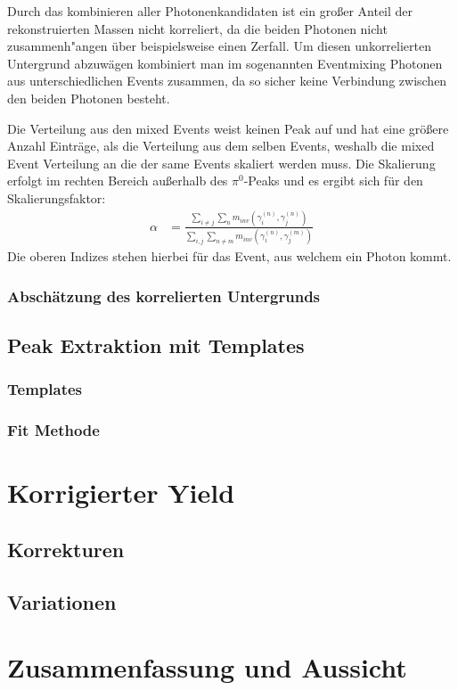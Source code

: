 \documentclass[]{article}
\begin{document}
	Durch das kombinieren aller Photonenkandidaten ist ein gro{\ss}er Anteil der rekonstruierten Massen nicht korreliert, da die beiden Photonen nicht zusammenh{"a}ngen {\"u}ber beispielsweise einen Zerfall. Um diesen unkorrelierten Untergrund abzuw{\"a}gen kombiniert man im sogenannten Eventmixing Photonen aus unterschiedlichen Events zusammen, da so sicher keine Verbindung zwischen den beiden Photonen besteht.
	
	
	Die Verteilung aus den mixed Events weist keinen Peak auf und hat eine gr{\"o}{\ss}ere Anzahl Eintr{\"a}ge, als die Verteilung aus dem selben Events, weshalb die mixed Event Verteilung an die der same Events skaliert werden muss. Die Skalierung erfolgt im rechten Bereich au{\ss}erhalb des $\pi^{0}$-Peaks und es ergibt sich f{\"u}r den Skalierungsfaktor:
	\begin{align}
	\alpha &= \frac{\sum_{i \neq j}\sum_{n}m_{inv}\left( \gamma^{(n)}_{i},\gamma^{(n)}_{j}\right) }{\sum_{i,j}\sum_{n \neq m}m_{inv}\left( \gamma^{(n)}_{i},\gamma^{(m)}_{j}\right) }
	\end{align}
	Die oberen Indizes stehen hierbei f{\"u}r das Event, aus welchem ein Photon kommt. 
	\subsubsection{Absch{\"a}tzung des korrelierten Untergrunds}
	\subsection{Peak Extraktion mit Templates}
	\subsubsection{Templates}
	\subsubsection{Fit Methode}
	\section{Korrigierter Yield}
	\subsection{Korrekturen}
	\subsection{Variationen}
	\section{Zusammenfassung und Aussicht}
\end{document}

